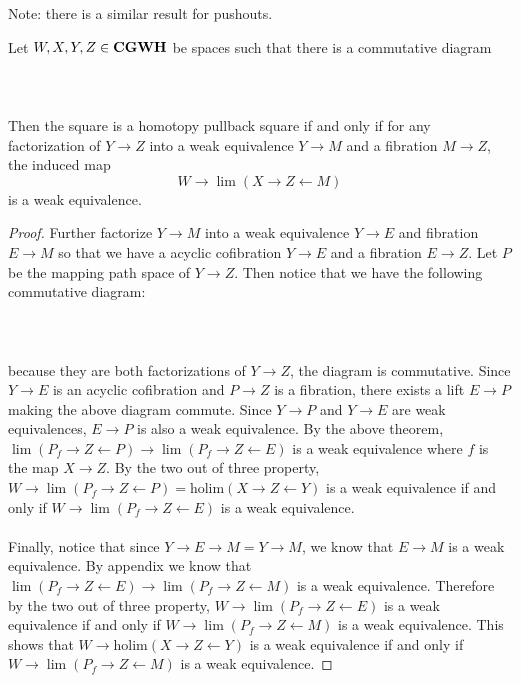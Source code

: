 \documentclass[a4paper]{article}
\begin{document}
Note: there is a similar result for pushouts. \\

\begin{prp}{}{} Let $W,X,Y,Z\in\bold{CGWH}$ be spaces such that there is a commutative diagram \\~\\
\\~\\
Then the square is a homotopy pullback square if and only if for any factorization of $Y\to Z$ into a weak equivalence $Y\to M$ and a fibration $M\to Z$, the induced map $$W\to\lim(X\rightarrow Z\leftarrow M)$$ is a weak equivalence. \tcbline
\begin{proof}
Further factorize $Y\to M$ into a weak equivalence $Y\to E$ and fibration $E\to M$ so that we have a acyclic cofibration $Y\to E$ and a fibration $E\to Z$. Let $P$ be the mapping path space of $Y\to Z$. Then notice that we have the following commutative diagram: \\~\\
\\~\\
because they are both factorizations of $Y\to Z$, the diagram is commutative. Since $Y\to E$ is an acyclic cofibration and $P\to Z$ is a fibration, there exists a lift $E\to P$ making the above diagram commute. Since $Y\to P$ and $Y\to E$ are weak equivalences, $E\to P$ is also a weak equivalence. By the above theorem, $\lim(P_f\rightarrow Z\leftarrow P)\to\lim(P_f\rightarrow Z\leftarrow E)$ is a weak equivalence where $f$ is the map $X\to Z$. By the two out of three property, $W\to\lim(P_f\to Z\leftarrow P)=\text{holim}(X\rightarrow Z\leftarrow Y)$ is a weak equivalence if and only if $W\to\lim(P_f\to Z\leftarrow E)$ is a weak equivalence. \\~\\

Finally, notice that since $Y\to E\to M=Y\to M$, we know that $E\to M$ is a weak equivalence. By appendix we know that $\lim(P_f\rightarrow Z\leftarrow E)\to\lim(P_f\rightarrow Z\leftarrow M)$ is a weak equivalence. Therefore by the two out of three property, $W\to\lim(P_f\rightarrow Z\leftarrow E)$ is a weak equivalence if and only if $W\to\lim(P_f\rightarrow Z\leftarrow M)$ is a weak equivalence. This shows that $W\to\text{holim}(X\rightarrow Z\leftarrow Y)$ is a weak equivalence if and only if $W\to\lim(P_f\rightarrow Z\leftarrow M)$ is a weak equivalence. 
\end{proof}
\end{prp}
\end{document}

